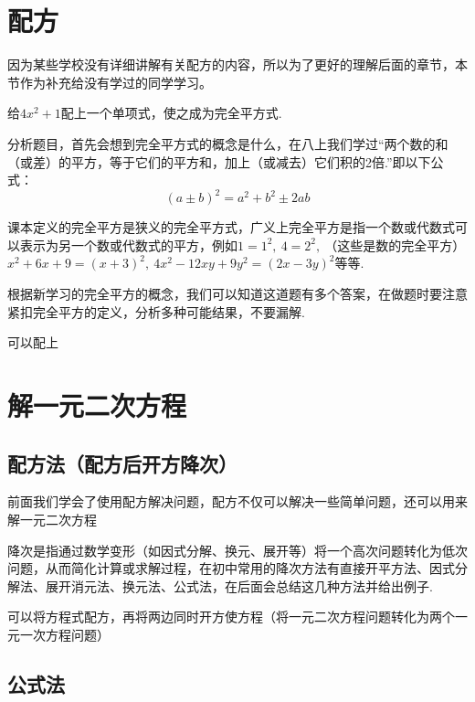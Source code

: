 \documentclass[lang=cn, 10pt, titlestyle=hang]{elegantbook}
\begin{document}
\section{配方}



因为某些学校没有详细讲解有关配方的内容，所以为了更好的理解后面的章节，本节作为补充给没有学过的同学学习。



\begin{example}
    给\( 4x^2 +1\)配上一个单项式，使之成为完全平方式.
\end{example}



分析题目，首先会想到完全平方式的概念是什么，在八上我们学过“两个数的和（或差）的平方，等于它们的平方和，加上（或减去）它们积的2倍.”即以下公式：
$$
(a\pm b)^2 = a^2+b^2\pm 2ab
$$



课本定义的完全平方是狭义的完全平方式，广义上完全平方是指一个数或代数式可以表示为另一个数或代数式的平方，例如\( 1=1^2,\ 4=2^2,\ \)（这些是数的完全平方）\(x^2+6x+9=(x+3)^2,\ 4x^2-12xy+9y^2=(2x-3y)^2\)等等.



根据新学习的完全平方的概念，我们可以知道这道题有多个答案，在做题时要注意紧扣完全平方的定义，分析多种可能结果，不要漏解.
\begin{solution}
    可以配上
\end{solution}

\section{解一元二次方程}
\subsection{配方法（配方后开方降次）}
前面我们学会了使用配方解决问题，配方不仅可以解决一些简单问题，还可以用来解一元二次方程



降次是指通过数学变形（如因式分解、换元、展开等）将一个高次问题转化为低次问题，从而简化计算或求解过程，在初中常用的降次方法有直接开平方法、因式分解法、展开消元法、换元法、公式法，在后面会总结这几种方法并给出例子.



可以将方程式配方，再将两边同时开方使方程（将一元二次方程问题转化为两个一元一次方程问题）

\subsection{公式法}
\end{document}
